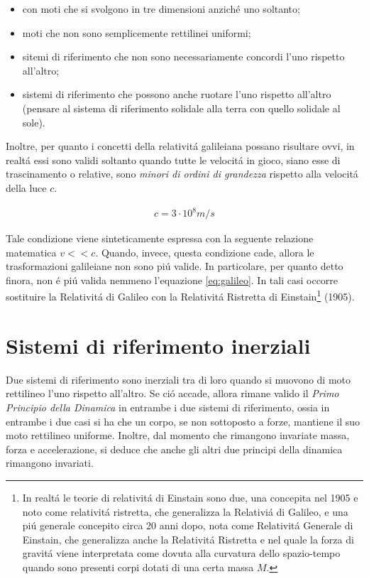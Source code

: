 \documentclass[17pt]{extarticle}
\begin{document}
\begin{itemize}
	\item con moti che si svolgono in tre dimensioni anzich\'e uno soltanto;
	\item moti che non sono semplicemente rettilinei uniformi;
	\item sitemi di riferimento che non sono necessariamente concordi l'uno rispetto all'altro;
	\item sistemi di riferimento che possono anche ruotare l'uno rispetto all'altro (pensare al sistema di riferimento solidale alla terra con quello solidale al sole).
\end{itemize}

Inoltre, per quanto i concetti della relativit\'a galileiana possano risultare ovvi, in realt\'a essi sono validi soltanto quando tutte le velocit\'a in gioco, siano esse di trascinamento o relative, sono \emph{minori di ordini di grandezza} rispetto alla velocit\'a della luce $c$.

\begin{eqnarray}
	c = 3\cdot 10^8m/s
\end{eqnarray}


Tale condizione viene sinteticamente espressa con la seguente relazione matematica $v<<c$. Quando, invece, questa condizione cade, allora le trasformazioni galileiane non sono pi\'u valide. In particolare, per quanto detto finora, non \'e pi\'u valida nemmeno l'equazione  \ref{eq:galileo}. In tali casi occorre sostituire la Relativit\'a di Galileo con la Relativit\'a Ristretta di Einstain\footnote{In realt\'a le teorie di relativit\'a di Einstain sono due, una concepita nel 1905 e noto come relativit\'a ristretta, che generalizza la Relativi\'a di Galileo, e una pi\'u generale concepito circa 20 anni dopo, nota  come Relativit\'a Generale di Einstain, che generalizza anche la Relativit\'a Ristretta e nel quale la forza di gravit\'a viene interpretata come dovuta alla curvatura dello spazio-tempo quando sono presenti corpi dotati di una certa massa $M$.} (1905).


\section{Sistemi di riferimento inerziali}
	
	
Due sistemi di riferimento sono inerziali tra di loro quando si muovono di moto rettilineo l'uno rispetto all'altro. Se ci\'o accade, allora rimane valido il \emph{Primo Principio della Dinamica} in entrambe i due sistemi di riferimento, ossia in entrambe i due casi si ha che un corpo, se non sottoposto a forze, mantiene il suo moto rettilineo uniforme. Inoltre, dal momento che rimangono invariate massa, forza e accelerazione, si deduce che anche gli altri due principi della dinamica rimangono invariati.
\end{document}
